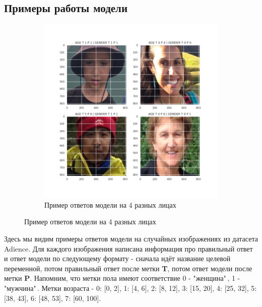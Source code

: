 \subsection{Примеры работы модели}\label{subsec:примеры-работы-модели2}
\begin{figure}[h!]
    \centering
    \begin{subfigure}[b]{1.02\linewidth}
        \includegraphics[width=\linewidth]{images/image.png}
        \caption{Пример ответов модели на 4 разных лицах}
    \end{subfigure}
\end{figure}
Здесь мы видим примеры ответов модели на случайных изображениях из датасета Adience.
Для каждого изображения написана информация про правильный ответ и ответ модели по следующему формату -
сначала идёт название целевой переменной, потом правильный ответ после метки \textbf{T}, потом ответ модели после метки \textbf{P}.
Напомним, что метки пола имеют соответствие 0 - "женщина"\,, 1 - "мужчина"\,.
Метки возраста - 0: [0, 2], 1: [4, 6], 2: [8, 12], 3: [15, 20], 4: [25, 32], 5: [38, 43], 6: [48, 53], 7: [60, 100].
